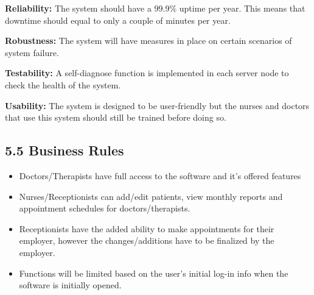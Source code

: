 \documentclass[12pt]{article}
\renewcommand{\_}{\kern-1.5pt\textunderscore\kern-1.5pt}
\begin{document}
\vspace{\baselineskip}
\textbf{Reliability: }The system should have a 99.9$\%$  uptime per year. This means that downtime should equal to only a couple of minutes per year. \par


\vspace{\baselineskip}
\textbf{Robustness: }The system will have measures in place on certain scenarios of system failure.\par


\vspace{\baselineskip}
\textbf{Testability: }A self-diagnose function is implemented in each server node to check the health of the system. \par


\vspace{\baselineskip}
\textbf{Usability: }The system is designed to be user-friendly but the nurses and doctors that use this system should still be trained before doing so.\par

\subsection*{5.5 \hspace*{10pt}Business Rules}
\begin{itemize}
	\item Doctors/Therapists have full access to the software and it’s offered features\par

	\item Nurses/Receptionists can add/edit patients, view monthly reports and appointment schedules for doctors/therapists. \par

	\item Receptionists have the added ability to make appointments for their employer, however the changes/additions have to be finalized by the employer.\par

	\item Functions will be limited based on the user’s initial log-in info when the software is initially opened.
\end{itemize}\par


\vspace{\baselineskip}
\end{document}
